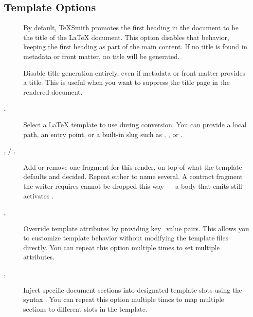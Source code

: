 \documentclass[a4paper,twoside]{article}
\begin{document}
\subsection{Template Options}
\begin{description}
\item[{}] By default, TeXSmith promotes the first heading in the document to be the title of the \LaTeX{} document. This option disables that behavior, keeping the first heading as part of the main content. If no title is found in metadata or front matter, no title will be generated.
\item[{}] Disable title generation entirely, even if metadata or front matter provides a title. This is useful when you want to suppress the title page in the rendered document.
\item[{, }] Select a \LaTeX{} template to use during conversion. You can provide a local path, an entry point, or a built-in slug such as , , or .
\item[{,  / , }] Add or remove one fragment for this render, on top of what the template defaults and  decided. Repeat either to name several. A contract fragment the writer requires cannot be dropped this way --- a body that emits  still activates .
\item[{, }] Override template attributes by providing key=value pairs. This allows you to customize template behavior without modifying the template files directly. You can repeat this option multiple times to set multiple attributes.
\item[{, }] Inject specific document sections into designated template slots using the syntax . You can repeat this option multiple times to map multiple sections to different slots in the template.
\end{description}
\end{document}
